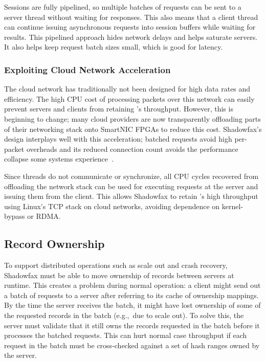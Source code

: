 Sessions are fully pipelined, so multiple batches of requests can be sent to a
server thread without waiting for responses.
%
This also means that a
client thread can continue issuing asynchronous requests into session
buffers while waiting for results.
%
This pipelined approach hides network delays and helps saturate servers.
%
It also helps keep request batch sizes small, which is good for latency.

%
%

\subsubsection{Exploiting Cloud Network Acceleration}

The cloud network has traditionally not been designed for high data
rates and efficiency.
%
The high CPU cost of processing packets over this network can easily
prevent servers and clients from retaining \faster's throughput.
%
However, this is beginning to change; many cloud providers are now
transparently offloading parts of their networking stack onto SmartNIC
FPGAs to reduce this cost.
%
Shadowfax's design interplays well with this acceleration; batched requests
avoid high per-packet overheads and its reduced connection count avoids the
performance collapse some systems experience~\cite{farm-2014}.

Since threads do not communicate or synchronize, all CPU cycles
recovered from offloading the network stack can be used for executing
requests at the server and issuing them from the client.
%
This allows Shadowfax to retain \faster's high throughput using Linux's
TCP stack on cloud networks, avoiding dependence on kernel-bypass
or RDMA.

\subsection{Record Ownership}
\label{sec:ownership}

To support distributed operations such as scale out and crash recovery,
Shadowfax must be able to move ownership of records between servers at
runtime.
%
This creates a problem during normal operation:
%
a client might send out a batch of requests to a server after referring
to its cache of ownership mappings.
%
By the time the server receives the batch, it might have lost ownership of
some of the requested records in the batch (e.g.,\ due to scale out).
%
To solve this, the server must validate that it still owns the records requested
in the batch before it processes the batched requests.
%
This can hurt normal case throughput if each request in the
batch must be cross-checked against a set of hash ranges owned by the server.

